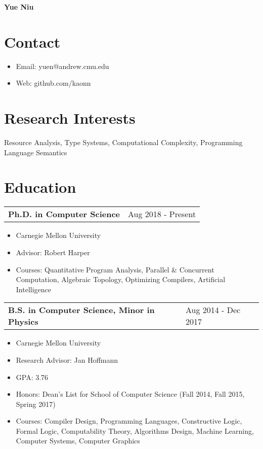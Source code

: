\documentclass[12pt]{article}
\renewcommand{\maketitle}{
\begin{center}
{\huge\bfseries Yue Niu}\\
\end{center}
}
\begin{document}
\maketitle

\section{Contact}
\begin{itemize}
\itemsep-2pt
\item Email: yuen@andrew.cmu.edu 
\item Web: github.com/kaonn 
\end{itemize}

\section{Research Interests}

Resource Analysis, Type Systems, Computational Complexity, Programming Language Semantics\\

\section{Education}

\begin{tabu} to 
Ph.D. in Computer Science & Aug 2018 - Present
\end{tabu}

\vspace{-5pt}
\begin{itemize}
\itemsep-5pt
\item Carnegie Mellon University
\item Advisor: Robert Harper
\item Courses: 
   Quantitative Program Analysis,
   Parallel \& Concurrent Computation, 
   Algebraic Topology,
   Optimizing Compilers, 
   Artificial Intelligence
\end{itemize}

\begin{tabu} to 
B.S. in Computer Science, Minor in Physics & Aug 2014 - Dec 2017
\end{tabu}

\vspace{-5pt}
\begin{itemize}
\itemsep-2pt
\item Carnegie Mellon University
\item Research Advisor: Jan Hoffmann
\item GPA: 3.76
\item Honors: Dean's List for School of Computer Science (Fall 2014, Fall  2015, Spring 2017)
\item Courses: 
   Compiler Design,
   Programming Languages, 
   Constructive Logic, Formal Logic, 
   Computability Theory, Algorithms Design,
   Machine Learning, Computer Systems, Computer Graphics
\end{itemize}
\end{document}
